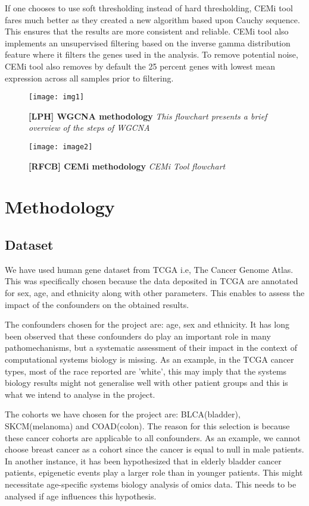 \documentclass[a4paper]{paper}
\begin{document}
 \begin{flushleft}
If one chooses to use soft thresholding instead of hard thresholding, CEMi tool fares much better as they created a new algorithm based upon Cauchy sequence. This ensures that the results are more consistent and reliable. CEMi tool also implements an unsupervised filtering based on the inverse gamma distribution feature where it filters the genes used in the analysis. To remove potential noise, CEMi tool also removes by default the 25 percent genes with lowest mean expression across all samples prior to filtering.
\end{flushleft}
\begin{figure}[t]
    \centering
    \texttt{[image: img1]}
    \caption{ \textbf{[LPH] WGCNA methodology} \textit{This flowchart presents a brief overview of the steps of WGCNA}}
    \label{fig:my_label}
\end{figure}

\begin{figure}[t]
    \texttt{[image: image2]}
    \caption{ \textbf{[RFCB] CEMi methodology} \textit{CEMi Tool flowchart}}
    \label{fig:my_label}
\end{figure}

\section{Methodology}
\subsection{Dataset}
 We have used human gene dataset from TCGA i.e, The Cancer Genome Atlas. This was specifically chosen because the data  deposited in TCGA are annotated for sex, age, and ethnicity along with other parameters. This enables to assess the impact of the confounders on the obtained results.

\noindent The confounders chosen for the project are: age, sex and ethnicity. It has long been observed that these confounders do play an important role in many pathomechanisms, but a systematic assessment of their impact in the context of computational systems biology is
missing. As an example, in the TCGA cancer types, most of the race reported are 'white', this may imply that the systems biology results might not generalise well with other patient groups and this is what we intend to analyse in the project. 

\bigskip
\noindent The cohorts we have chosen for the project are: BLCA(bladder), SKCM(melanoma) and COAD(colon). The reason for this selection is because these cancer cohorts are applicable to all confounders. As an example, we cannot choose breast cancer as a cohort since the cancer is equal to null in male patients.
In another instance, it has been hypothesized that in elderly bladder cancer patients, epigenetic events play a larger role than in younger patients. This might necessitate age-specific systems biology analysis of omics data. This needs to be analysed if age influences this hypothesis.
\end{document}

